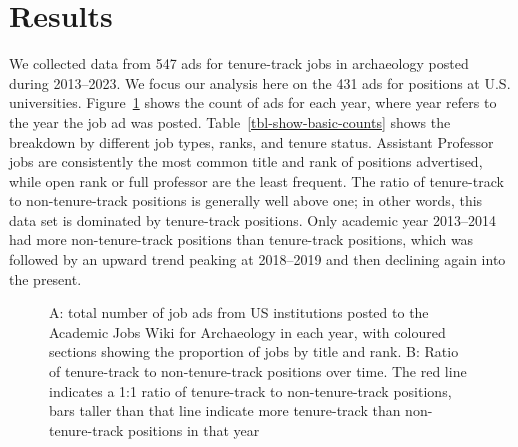 \documentclass[
  12pt,
]{article}
\begin{document}
\section{Results}\label{results}

We collected data from 547 ads for tenure-track jobs in archaeology
posted during 2013--2023. We focus our analysis here on the 431 ads for
positions at U.S. universities. Figure~\ref{fig-show-basic-plots} shows
the count of ads for each year, where year refers to the year the job ad
was posted. Table~\ref{tbl-show-basic-counts} shows the breakdown by
different job types, ranks, and tenure status. Assistant Professor jobs
are consistently the most common title and rank of positions advertised,
while open rank or full professor are the least frequent. The ratio of
tenure-track to non-tenure-track positions is generally well above one;
in other words, this data set is dominated by tenure-track positions.
Only academic year 2013--2014 had more non-tenure-track positions than
tenure-track positions, which was followed by an upward trend peaking at
2018--2019 and then declining again into the present.

\begin{figure}


\caption{\label{fig-show-basic-plots}A: total number of job ads from US
institutions posted to the Academic Jobs Wiki for Archaeology in each
year, with coloured sections showing the proportion of jobs by title and
rank. B: Ratio of tenure-track to non-tenure-track positions over time.
The red line indicates a 1:1 ratio of tenure-track to non-tenure-track
positions, bars taller than that line indicate more tenure-track than
non-tenure-track positions in that year}

\end{figure}%
\end{document}
